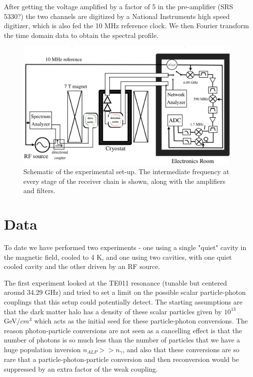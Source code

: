 \documentclass[11pt]{article}
\begin{document}
After getting the voltage amplified by a factor of 5 in the pre-amplifier (SRS 5330?) the two channels are digitized by a National Instruments high speed digitizer, which is also fed the 10 MHz reference clock. We then Fourier transform the time domain data to obtain the spectral profile.

\begin{figure}
\centering
\includegraphics[scale=0.35]{malagon_ana_fig1}
\caption{Schematic of the experimental set-up. The intermediate frequency at every stage of the receiver chain is shown, along with the amplifiers and filters.}
\label{fig:schematic}
\end{figure}

\section{Data}

To date we have performed two experiments - one using a single "quiet" cavity in the magnetic field, cooled to 4 K, and one using two cavities, with one quiet cooled cavity and the other driven by an RF source.

The first experiment looked at the TE011 resonance (tunable but centered around 34.29 GHz) and tried to set a limit on the possible scalar particle-photon couplings that this setup could potentially detect. The starting assumptions are that the dark matter halo has a density of these scalar particles given by  $10^{13}$ GeV/${cm}^3$ which acts as the initial seed for these particle-photon conversions. The reason photon-particle conversions are not seen as a cancelling effect is that the number of photons is so much less than the number of particles that we have a huge population inversion $n_{ALP} >> n_{\gamma}$, and also that these conversions are so rare that a particle-photon-particle conversion and then reconversion would be suppressed by an extra factor of the weak coupling.
\end{document}
